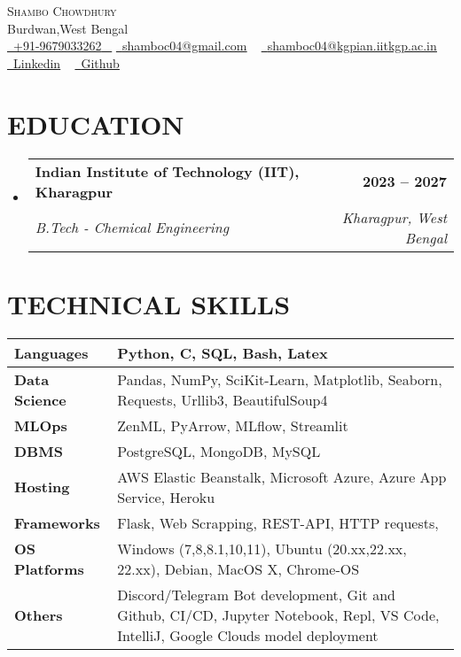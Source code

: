 \documentclass[letterpaper,11pt]{article}
\makeatletter
\newcommand{\resumeSubheading}[4]{
  \vspace{-2pt}\item
    \begin{tabular*}{1.0\textwidth}[t]{l@{\extracolsep{\fill}}r}
      \textbf{\large#1} & \textbf{\small #2} \\
      \textit{\large#3} & \textit{\small #4} \\
      
    \end{tabular*}\vspace{-7pt}
}
\newcommand{\resumeSubHeadingListStart}{\begin{itemize}[leftmargin=0.0in, label={}]}
\newcommand{\resumeSubHeadingListEnd}{\end{itemize}}
\makeatother
\begin{document}


\begin{center}
    {\Huge \scshape Shambo Chowdhury} \\ \vspace{1pt}
    Burdwan,West Bengal \\ \vspace{1pt}
    \small \href{tel:#}{ \raisebox{-0.1\height}\faPhone\ \underline{+91-9679033262} ~} 
    \href{mailto:shamboc04@gmail.com}{\raisebox{-0.2\height}\faEnvelope\  \underline{shamboc04@gmail.com}} ~ 
    \href{mailto:shamboc04@kgpian.iitkgp.ac.in}{\raisebox{-0.2\height}\faEnvelope\  \underline{shamboc04@kgpian.iitkgp.ac.in}} ~ 
    \href{https://linkedin.com/in/shambo04}{\raisebox{-0.2\height}\faLinkedinSquare\ \underline{Linkedin}}  ~
    \href{https://github.com/typhonshambo}{\raisebox{-0.2\height}\faGithub\ \underline{Github}} ~

\end{center}
 \vspace{0.5mm}


\section{EDUCATION}
  \resumeSubHeadingListStart
    \resumeSubheading
      {Indian Institute of Technology (IIT), Kharagpur}{2023 – 2027}
      {B.Tech - Chemical Engineering}{Kharagpur, West Bengal}
  \resumeSubHeadingListEnd
  

\section{TECHNICAL SKILLS}
\vspace{-5pt}
\begin{center}
\renewcommand{\arraystretch}{1.2}
\begin{tabularx}{\textwidth}{l|p{15cm}}
\hline
\textbf{Languages} & Python, C, SQL, Bash, Latex \\
\hline
\textbf{Data Science} & Pandas, NumPy, SciKit-Learn, Matplotlib, Seaborn, Requests, Urllib3, BeautifulSoup4 \\
\hline
\textbf{MLOps} & ZenML, PyArrow, MLflow, Streamlit \\
\hline
\textbf{DBMS} & PostgreSQL, MongoDB, MySQL \\
\hline
\textbf{Hosting} & AWS Elastic Beanstalk, Microsoft Azure, Azure App Service, Heroku \\
\hline
\textbf{Frameworks} & Flask, Web Scrapping, REST-API, HTTP requests, \\
\hline
\textbf{OS Platforms} & Windows (7,8,8.1,10,11), Ubuntu (20.xx,22.xx, 22.xx), Debian, MacOS X, Chrome-OS \\
\hline
\textbf{Others} & Discord/Telegram Bot development, Git and Github, CI/CD, Jupyter Notebook, Repl, VS Code, IntelliJ, Google Clouds model deployment \\
\hline
\end{tabularx}
\end{center}
\end{document}
